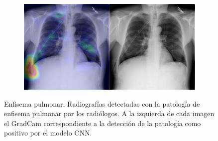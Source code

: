 \begin{figure}[b]
\begin{subfigure}{0.4\textwidth}
    \end{subfigure}
    \begin{subfigure}{0.4\textwidth}
        \centering
        \includegraphics[width=1.0\textwidth]{Chapters/5. Conclusiones/img/Emphysema/1_1_00023078_006.png}
    \end{subfigure}

    \caption[short]{Enfisema pulmonar. Radiografías detectadas con la patología de enfisema pulmonar por los
                    radiólogos. A la izquierda de cada imagen el GradCam correspondiente a la detección
                    de la patología como positivo por el modelo CNN.}
\end{figure}

